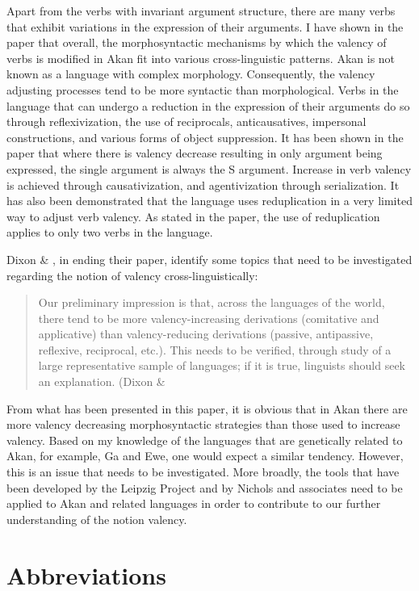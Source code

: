 \documentclass[output=paper]{langsci/langscibook}
\begin{document}
Apart from the verbs with invariant argument structure, there are many verbs that exhibit variations in the expression of their arguments. I have shown in the paper that overall, the morphosyntactic mechanisms by which the valency of verbs is modified in Akan fit into various cross-linguistic patterns. Akan is not known as a language with complex morphology. Consequently, the valency adjusting processes tend to be more syntactic than morphological. Verbs in the language that can undergo a reduction in the expression of their arguments do so through reflexivization, the use of reciprocals, anticausatives, impersonal constructions, and various forms of object suppression. It has been shown in the paper that where there is valency decrease resulting in only argument being expressed, the single argument is always the S argument.  Increase in verb valency is achieved through causativization, and agentivization through serialization. It has also been demonstrated that the language uses reduplication in a very limited way to adjust verb valency. As stated in the paper, the use of reduplication applies to only two verbs in the language.

Dixon \& \citet[25-27]{Aikhenvald2000b}, in ending their paper, identify some topics that need to be investigated regarding the notion of valency cross-linguistically:

\begin{quote}
Our preliminary impression is that, across the languages of the world, there tend to be more valency-increasing derivations (comitative and applicative) than valency-reducing derivations (passive, antipassive, reflexive, reciprocal, etc.). This needs to be verified, through study of a large representative sample of languages; if it is true, linguists should seek an explanation. (Dixon \& \citet[26]{Aikhenvald2000b}  
\end{quote}

From what has been presented in this paper, it is obvious that in Akan there are more valency decreasing morphosyntactic strategies than those used to increase valency. Based on my knowledge of the languages that are genetically related to Akan, for example, Ga and Ewe, one would expect a similar tendency. However, this is an issue that needs to be investigated. More broadly, the tools that have been developed by the Leipzig Project and by Nichols and associates need to be applied to Akan and related languages in order to contribute to our further understanding of the notion valency.

\section*{Abbreviations}
\end{document}
